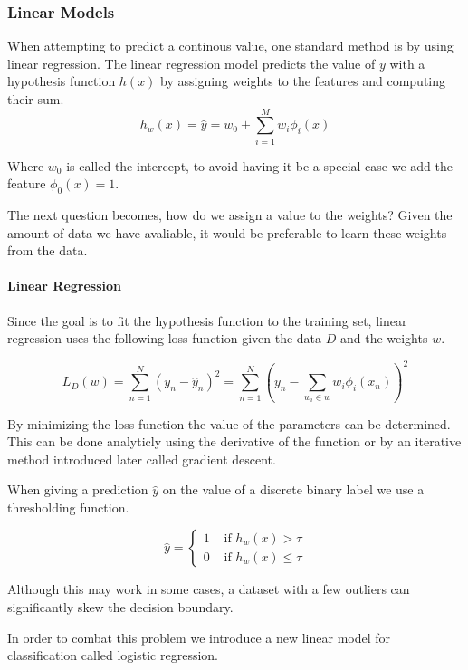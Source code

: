 \subsubsection{Linear Models}

When attempting to predict a continous value, one standard method is by using linear regression.
The linear regression model predicts the value of $y$ with a hypothesis function $h(x)$ by assigning weights to the features and computing their sum.
$$h_w(x) = \hat{y} = w_0 + \sum_{i=1}^M w_i \phi_i(x)$$ 

Where $w_0$ is called the intercept, to avoid having it be a special case we add the feature $\phi_0(x)=1$.

The next question becomes, how do we assign a value to the weights?
Given the amount of data we have avaliable, it would be preferable to learn these weights from the data. 

\paragraph{Linear Regression}
Since the goal is to fit the hypothesis function to the training set, linear regression uses the following loss function given the data $D$ and the weights $w$.

$$ L_D(w) = \sum_{n=1}^N (y_n-\hat{y}_n)^2 = \sum_{n=1}^N (y_n - \sum_{w_i \in w} w_i \phi_i(x_n))^2 $$ 

By minimizing the loss function the value of the parameters can be determined.
This can be done analyticly using the derivative of the function or by an iterative method introduced later called gradient descent.

When giving a prediction $\hat{y}$ on the value of a discrete binary label we use a thresholding function.

$$\hat{y} = \begin{cases}
	1 &\text{ if } h_w(x) > \tau \\
	0 &\text{ if } h_w(x) \leq \tau  %
\end{cases}$$ 

Although this may work in some cases, a dataset with a few outliers can significantly skew the decision boundary.

In order to combat this problem we introduce a new linear model for classification called logistic regression.

